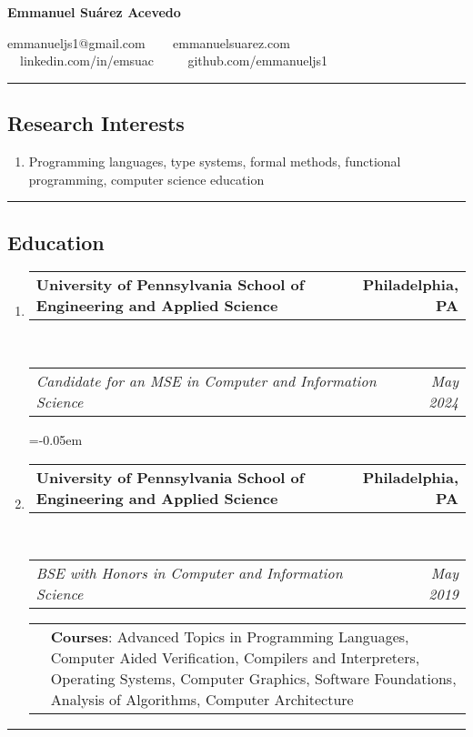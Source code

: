 \documentclass[letterpaper]{article}
\makeatletter
\newcommand*{\tabulardef}[3]{\begin{tabular}[t]{@{}lp{\dimexpr\linewidth-#1}@{}}
    #2&#3
\end{tabular}}
\newcommand{\headerrow}[2]
{\begin{tabular*}{\linewidth}{l@{\extracolsep{\fill}}r}
	#1 &
	#2 \\
\end{tabular*}}
\makeatother
\begin{document}
\begin{center}
{\LARGE \textbf{Emmanuel Suárez Acevedo}}

emmanueljs1@gmail.com \ \textbullet
\ \ emmanuelsuarez.com \\

\ \ linkedin.com/in/emsuac \ \ \textbullet
\ \ github.com/emmanueljs1\\
\end{center}

\hrule
\vspace{-0.6em}
\subsection*{Research Interests}
\begin{enumerate}[label=]
	\parskip=-0.25em

    \item Programming languages, type systems, formal methods, functional programming, computer science education
\end{enumerate}

\hrule
\vspace{-0.6em}
\subsection*{Education}

\begin{enumerate}[label=]
	\parskip=-0.05em
	\item 
	\headerrow
		{\textbf{University of Pennsylvania School of Engineering and Applied Science}}
		{\textbf{Philadelphia, PA}}
	\\
	\headerrow
		{\emph{Candidate for an MSE in Computer and Information Science}}
		{\emph{May 2024}}

	\parskip=-0.05em
	\item 
	\headerrow
		{\textbf{University of Pennsylvania School of Engineering and Applied Science}}
		{\textbf{Philadelphia, PA}}
	\\
	\headerrow
		{\emph{BSE with Honors in Computer and Information Science}}
		{\emph{May 2019}}
        \tabulardef{2.5cm}{}{\textbf{Courses}: Advanced Topics in Programming Languages, Computer Aided Verification, Compilers and Interpreters, Operating Systems, Computer Graphics, Software Foundations, Analysis of Algorithms, Computer Architecture }

\end{enumerate}

\hrule
\vspace{-0.6em}
\end{document}
